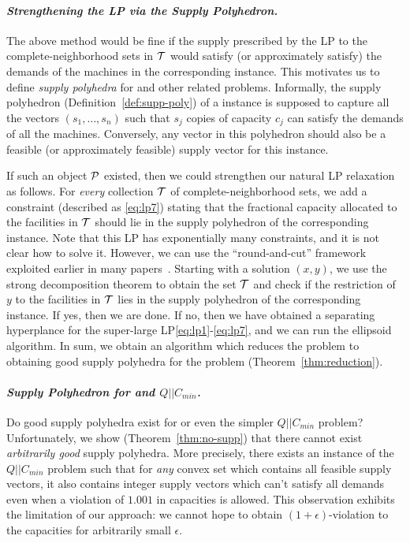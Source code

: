 \paragraph{\emph{Strengthening the LP via the Supply Polyhedron.}}
The above method would be fine if the supply  prescribed by the LP to the complete-neighborhood sets in ${\cal T}$ would satisfy (or approximately satisfy) the demands of the machines in the corresponding \cckp instance. This motivates us  to define {\em supply polyhedra} for \cckp and other related problems. Informally, the supply polyhedron (Definition~\ref{def:supp-poly}) of a \cckp instance is supposed to capture all the vectors $(s_1,\ldots,s_n)$ such that $s_j$ copies of capacity $c_j$ can satisfy the demands of all the machines. Conversely, any vector in this polyhedron should also be a feasible (or approximately feasible) supply vector for this instance.

 If such an object ${\cal P}$ existed, then we could strengthen our natural LP relaxation as follows. For {\em every} collection ${\cal T}$ of complete-neighborhood sets, we add a constraint (described as \eqref{eq:lp7}) stating that the fractional capacity allocated to the facilities in ${\cal T}$ should
 lie in the supply polyhedron of the corresponding \cckp instance. Note that this LP has exponentially many constraints, and it is not clear how to solve it. However, we can use the ``round-and-cut'' framework exploited earlier in many papers~\cite{CarrFLP00,ChakrabartyCKK11,AnSS14,DemirciL16,Li15,Li16}. Starting with a solution $(x,y)$, we use the strong decomposition theorem to obtain the set ${\cal T}$ and check if the restriction of $y$ to the facilities in ${\cal T}$ lies in the supply polyhedron of the corresponding \cckp instance. If yes, then we are done.
 If no, then we have obtained a separating hyperplance for the super-large LP\eqref{eq:lp1}-\eqref{eq:lp7}, and we can run the ellipsoid algorithm. In sum, we obtain an algorithm which reduces the \mckc problem to obtaining good supply polyhedra for the \cckp problem (Theorem~\ref{thm:reduction}).%

\paragraph{\emph{Supply Polyhedron for \cckp and $Q||C_{min}$.}}
Do good supply polyhedra exist for \cckp or even the simpler $Q||C_{min} $ problem? Unfortunately, we show (Theorem~\ref{thm:no-supp}) that there cannot exist {\em arbitrarily good} supply polyhedra. More precisely, there exists an instance of the $Q||C_{min}$ problem such that
for {\em any} convex set which contains all feasible supply vectors, it also contains integer supply vectors which can't satisfy all demands even when a violation of $1.001$ in capacities  is allowed. This observation exhibits the limitation of our approach: we cannot hope to obtain $(1+\epsilon)$-violation to the capacities for arbitrarily small $\epsilon$.

